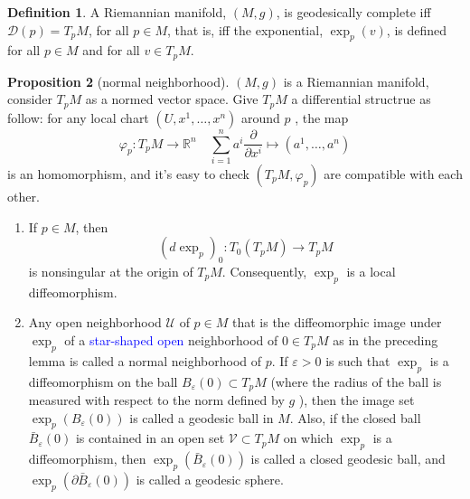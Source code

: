 \documentclass[12pt,a4paper]{book}
\newcommand{\bb}[1]{\mathbb{#1}}
\newcommand{\blue}[1]{\textcolor{blue}{#1}}
\newenvironment{enu}{\begin{enumerate}[(1)]}{\end{enumerate}}
\theoremstyle{definition}
\newtheorem{defn}{Definition}[section]
\newtheorem{prop}[defn]{Proposition}
\begin{document}
\begin{defn}
    A Riemannian manifold, $(M, g)$, is geodesically complete iff $\mathcal{D}(p)=T_p M$,
    for all $p \in M$, that is, iff the exponential, $\exp _p(v)$, is defined for all $p \in M$ and for all $v \in T_p M$.
\end{defn}
\begin{prop}[normal neighborhood]
    $(M, g)$ is a Riemannian manifold, consider $T_pM$ as a normed vector space. Give $T_pM$ a differential structrue as follow: for any
    local chart $(U,x^1,\dots,x^n)$ around $p$ , the map
    $$
        \varphi_p:T_pM\rightarrow \bb{R}^n\quad \sum_{i=1}^n a^i\frac{\partial}{\partial x^i}\mapsto (a^1,\dots,a^n)
    $$
    is an homomorphism, and it's easy to check $(T_pM,\varphi_p)$ are compatible with each other.

    \begin{enu}
        \item  If $p \in M$, then
        $$
            (d\exp _p)_0: T_0\left(T_p M\right) \rightarrow T_p M
        $$
        is nonsingular at the origin of $T_p M$. Consequently, $\exp _p$ is a local diffeomorphism.
        \item Any open neighborhood $\mathcal{U}$ of $p \in M$ that is the diffeomorphic
        image under $\exp _p$ of a \blue{star-shaped open} neighborhood of $0 \in T_p M$ as in the preceding
        lemma is called a normal neighborhood of $p$. If $\varepsilon>0$ is such that $\exp _p$ is a diffeomorphism on the
        ball $B_{\varepsilon}(0) \subset T_p M$ (where the radius of the ball is measured with respect to the norm defined by $g$ ), then the image set $\exp _p\left(B_{\varepsilon}(0)\right)$ is called a geodesic ball in $M$. Also, if the closed ball $\bar{B}_{\varepsilon}(0)$ is contained in an open set $\mathcal{V} \subset T_p M$ on which $\exp _p$ is a diffeomorphism, then $\exp _p\left(\bar{B}_{\varepsilon}(0)\right)$ is
        called a closed geodesic ball, and $\exp _p\left(\partial \bar{B}_{\varepsilon}(0)\right)$ is called a geodesic sphere.
    \end{enu}

\end{prop}
\end{document}
